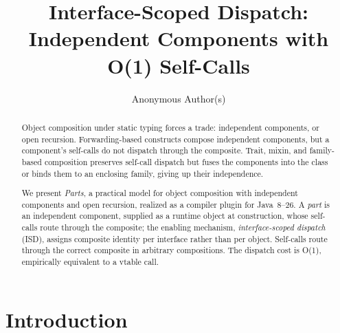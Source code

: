 \documentclass[sigplan,10pt,review,anonymous]{acmart}
\theoremstyle{acmplain}
\begin{document}
\title{Interface-Scoped Dispatch:\texorpdfstring{\\}{ }Independent Components with O(1) Self-Calls}

\author{Anonymous Author(s)}

\begin{abstract}
Object composition under static typing forces a trade: independent
components, or open recursion. Forwarding-based constructs compose independent components, but a component's self-calls do not dispatch through the composite. Trait, mixin, and family-based composition preserves self-call dispatch but fuses
the components into the class or binds them to an enclosing family, giving up their
independence.

We present \emph{Parts}, a practical model for object composition with
independent components and open recursion, realized as a compiler plugin
for Java~8--26.
A \emph{part} is an independent component, supplied as a runtime object at
construction, whose self-calls route through the composite; the enabling
mechanism, \emph{interface-scoped dispatch} (ISD), assigns composite identity
per interface rather than per object. Self-calls route
through the correct composite in arbitrary compositions. The dispatch cost is O(1), empirically equivalent to a vtable call.
\end{abstract}



\maketitle

\section{Introduction}
\end{document}

